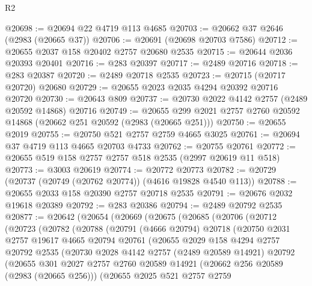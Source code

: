 \begin{lexlean}{R2}
\begin{coremodule}
@20698 := @20694 @22 @4719 @113 @4685
@20703 := @20662 @37 @2646 (@2983 (@20665 @37))
@20706 := @20691 (@20698 @20703 @7586)
@20712 := @20655 @2037 @158 @20402 @2757 @20680 @2535
@20715 := @20644 @2036 @20393 @20401
@20716 := @283 @20397
@20717 := @2489 @20716
@20718 := @283 @20387
@20720 := @2489 @20718 @2535
@20723 := @20715 (@20717 @20720) @20680
@20729 := @20655 @2023 @2035 @4294 @20392 @20716 @20720
@20730 := @20643 @809
@20737 := @20730 @2022 @4142 @2757 (@2489 @20592 @14868) @20716
@20749 := @20655 @299 @2021 @2757 @2760 @20592 @14868 (@20662 @251 @20592 (@2983 (@20665 @251)))
@20750 := @20655 @2019
@20755 := @20750 @521 @2757 @2759 @4665 @3025
@20761 := @20694 @37 @4719 @113 @4665 @20703 @4733
@20762 := @20755 @20761
@20772 := @20655 @519 @158 @2757 @2757 @518 @2535 (@2997 @20619 @11 @518)
@20773 := @3003 @20619
@20774 := @20772 @20773
@20782 := @20729 (@20737 (@20749 (@20762 @20774)) (@4616 @19828 @4540 @113))
@20788 := @20655 @2033 @158 @20390 @2757 @20718 @2535
@20791 := @20676 @2032 @19618 @20389
@20792 := @283 @20386
@20794 := @2489 @20792 @2535
@20877 := @20642
    (@20654
      (@20669
        (@20675
          (@20685
            (@20706
              (@20712
                (@20723
                  (@20782
                    (@20788
                      (@20791
                        (@4666 @20794)
                        @20718
                        (@20750
                          @2031
                          @2757
                          @19617
                          @4665
                          @20794
                          @20761
                          (@20655
                            @2029
                            @158
                            @4294
                            @2757
                            @20792
                            @2535
                            (@20730
                              @2028
                              @4142
                              @2757
                              (@2489 @20589 @14921)
                              @20792
                              (@20655
                                @301
                                @2027
                                @2757
                                @2760
                                @20589
                                @14921
                                (@20662 @256 @20589 (@2983 (@20665 @256)))
                                (@20655
                                  @2025
                                  @521
                                  @2757
                                  @2759

\end{coremodule}
\end{lexlean}

